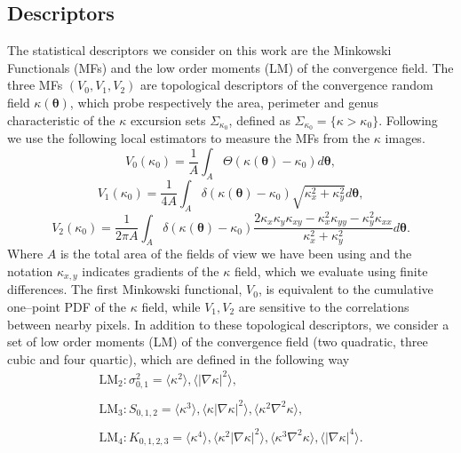 \documentclass[reprint,aps,prd,superscriptaddress,showkeys,showpacs]{revtex4-1}
\begin{document}
\subsection{Descriptors}
The statistical descriptors we consider on this work are the Minkowski Functionals (MFs) and the low order moments (LM) of the convergence field. The three MFs $(V_0,V_1,V_2)$ are topological descriptors of the convergence random field $\kappa(\pmb{\theta})$, which probe respectively the area, perimeter and genus characteristic of the $\kappa$ excursion sets $\Sigma_{\kappa_0}$, defined as $\Sigma_{\kappa_0}=\{\kappa>\kappa_0\}$. Following \citep{Petri2013,MinkJan} we use the following local estimators to measure the MFs from the $\kappa$ images. 
%
\begin{equation*}
\label{v0meas}
V_0(\kappa_0)=\frac{1}{A}\int_A\Theta(\kappa(\pmb{\theta})-\kappa_0)d\pmb{\theta},
\end{equation*}
\begin{equation}
\label{v1meas}
V_1(\kappa_0)=\frac{1}{4A}\int_A\delta(\kappa(\pmb{\theta})-\kappa_0)\sqrt{\kappa_x^2+\kappa_y^2}d\pmb{\theta},
\end{equation}
\begin{equation*}
\label{v2meas}
V_2(\kappa_0)=\frac{1}{2\pi A}\int_A\delta(\kappa(\pmb{\theta})-\kappa_0)\frac{2\kappa_x\kappa_y\kappa_{xy}-\kappa_x^2\kappa_{yy}-\kappa_y^2\kappa_{xx}}{\kappa_x^2+\kappa_y^2}d\pmb{\theta}.
\end{equation*}
%
Where $A$ is the total area of the fields of view we have been using and the notation $\kappa_{x,y}$ indicates gradients of the $\kappa$ field, which we evaluate using finite differences. The first Minkowski functional, $V_0$, is equivalent to the cumulative one--point PDF of the $\kappa$ field, while $V_1,V_2$ are sensitive to the correlations between nearby pixels. In addition to these topological descriptors, we consider a set of low order moments (LM) of the convergence field (two quadratic, three cubic and four quartic), which are defined in the following way
%
\begin{equation}
\begin{matrix}
\mathrm{LM_2}: \sigma_{0,1}^2 = \langle\kappa^2\rangle,\langle\vert\nabla\kappa\vert^2\rangle, \\ \\
\mathrm{LM_3}: S_{0,1,2} = \langle\kappa^3\rangle,\langle\kappa\vert\nabla\kappa\vert^2\rangle,\langle\kappa^2\nabla^2\kappa\rangle, \\ \\
\mathrm{LM_4}: K_{0,1,2,3} = \langle\kappa^4\rangle,\langle\kappa^2\vert\nabla\kappa\vert^2\rangle,\langle\kappa^3\nabla^2\kappa\rangle,\langle\vert\nabla\kappa\vert^4\rangle.
\end{matrix}
\end{equation}
\end{document}
